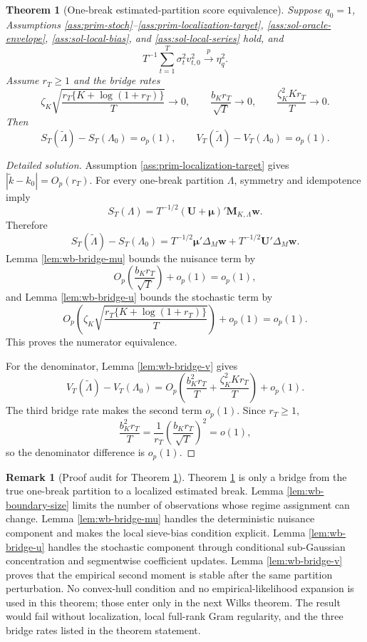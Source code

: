 \documentclass[12pt]{article}
\numberwithin{equation}{section}
\newtheorem{theorem}{Theorem}
\theoremstyle{definition}
\newtheorem{remark}{Remark}
\begin{document}
\begin{theorem}[One-break estimated-partition score equivalence]
\label{thm:wb-one-break-equivalence}
Suppose \(q_0=1\), Assumptions \ref{ass:prim-stoch}--\ref{ass:prim-localization-target},
\ref{ass:sol-oracle-envelope}, \ref{ass:sol-local-bias}, and
\ref{ass:sol-local-series} hold, and
\[
    T^{-1}\sum_{t=1}^T\sigma_t^2v_{t,0}^2\xrightarrow{p}\eta_q^2.
\]
Assume \(r_T\geq1\) and the bridge rates
\[
    \zeta_K\sqrt{\frac{r_T\{K+\log(1+r_T)\}}{T}}\to0,
    \qquad
    \frac{b_Kr_T}{\sqrt T}\to0,
    \qquad
    \frac{\zeta_K^2K r_T}{T}\to0.
\]
Then
\[
    S_T(\widetilde\Lambda)-S_T(\Lambda_0)=o_p(1),
    \qquad
    V_T(\widetilde\Lambda)-V_T(\Lambda_0)=o_p(1).
\]
\end{theorem}


\begin{proof}[Detailed solution]
Assumption \ref{ass:prim-localization-target} gives
\(|\widetilde k-k_0|=O_p(r_T)\).  For every one-break partition
\(\Lambda\), symmetry and idempotence imply
\[
    S_T(\Lambda)
    =T^{-1/2}(\bm U+\bm\mu)'\bm M_{K,\Lambda}\bm w.
\]
Therefore
\[
    S_T(\widetilde\Lambda)-S_T(\Lambda_0)
    =T^{-1/2}\bm\mu'\Delta_M\bm w
      +T^{-1/2}\bm U'\Delta_M\bm w.
\]
Lemma \ref{lem:wb-bridge-mu} bounds the nuisance term by
\[
    O_p\left(\frac{b_Kr_T}{\sqrt T}\right)+o_p(1)=o_p(1),
\]
and Lemma \ref{lem:wb-bridge-u} bounds the stochastic term by
\[
    O_p\left(\zeta_K\sqrt{\frac{r_T\{K+\log(1+r_T)\}}{T}}\right)+o_p(1)=o_p(1).
\]
This proves the numerator equivalence.

For the denominator, Lemma \ref{lem:wb-bridge-v} gives
\[
    V_T(\widetilde\Lambda)-V_T(\Lambda_0)
    =O_p\left(
       \frac{b_K^2r_T}{T}+
       \frac{\zeta_K^2Kr_T}{T}
      \right)+o_p(1).
\]
The third bridge rate makes the second term \(o_p(1)\).  Since \(r_T\geq1\),
\[
    \frac{b_K^2r_T}{T}
    =\frac{1}{r_T}
      \left(\frac{b_Kr_T}{\sqrt T}\right)^2=o(1),
\]
so the denominator difference is \(o_p(1)\).
\end{proof}

\begin{remark}[Proof audit for Theorem \ref{thm:wb-one-break-equivalence}]
Theorem \ref{thm:wb-one-break-equivalence} is only a bridge from the true
one-break partition to a localized estimated break.  Lemma
\ref{lem:wb-boundary-size} limits the number of observations whose regime
assignment can change.  Lemma \ref{lem:wb-bridge-mu} handles the deterministic
nuisance component and makes the local sieve-bias condition explicit.  Lemma
\ref{lem:wb-bridge-u} handles the stochastic component through conditional
sub-Gaussian concentration and segmentwise coefficient updates.  Lemma \ref{lem:wb-bridge-v} proves that the empirical
second moment is stable after the same partition perturbation.  No convex-hull
condition and no empirical-likelihood expansion is used in this theorem; those
enter only in the next Wilks theorem.  The result would fail without
localization, local full-rank Gram regularity, and the three bridge rates
listed in the theorem statement.
\end{remark}
\end{document}
